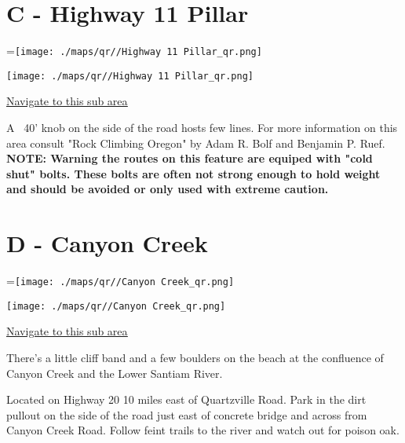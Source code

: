 \begin{multicols}{2}
\vfill\null
\columnbreak

\section{C - Highway 11 Pillar}\label{sa:Highway 11 Pillar}
=\hbox{\texttt{[image: ./maps/qr//Highway 11 Pillar\_qr.png]}}%
\begin{center}
\texttt{[image: ./maps/qr//Highway 11 Pillar\_qr.png]}
\end{center}
\begin{center}
\underline{\textcolor{blue}{\href{http://maps.google.com/maps?q=44.50089,-122.47419}{Navigate to this sub area}}}
\end{center}


A ~40' knob on the side of the road hosts few lines. For more information on this area consult "Rock Climbing Oregon" by  Adam R. Bolf and Benjamin P. Ruef.\\
\textbf{NOTE: Warning the routes on this feature are equiped with "cold shut" bolts. These bolts are often not strong enough to hold weight and should be avoided or only used with extreme caution.}\\




\vfill\null
\columnbreak

\section{D - Canyon Creek}\label{sa:Canyon Creek}
=\hbox{\texttt{[image: ./maps/qr//Canyon Creek\_qr.png]}}%
\begin{center}
\texttt{[image: ./maps/qr//Canyon Creek\_qr.png]}
\end{center}
\begin{center}
\underline{\textcolor{blue}{\href{http://maps.google.com/maps?q=44.39708529718213,-122.44671253776127}{Navigate to this sub area}}}
\end{center}


There's a little cliff band and a few boulders on the beach at the confluence of Canyon Creek and the Lower Santiam River.

Located on Highway 20 10 miles east of Quartzville Road. Park in the dirt pullout on the side of the road just east of concrete bridge and across from Canyon Creek Road. Follow feint trails to the river and watch out for poison oak.\\





\end{multicols}
